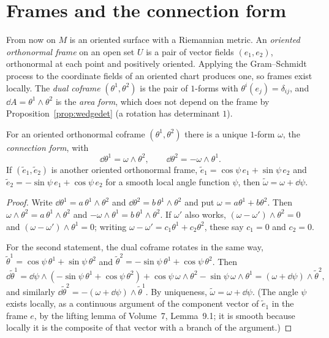 \section{Frames and the connection form}

From now on $M$ is an oriented surface with a Riemannian metric. An \emph{oriented orthonormal frame} on an open set $U$ is a pair of vector fields $(e_1,e_2)$,
orthonormal at each point and positively oriented. Applying the Gram--Schmidt process to the coordinate fields of an oriented chart produces one, so frames
exist locally. The \emph{dual coframe} $(\theta^1,\theta^2)$ is the pair of $1$-forms with $\theta^i(e_j)=\delta_{ij}$, and $\dd A=\theta^1\wedge\theta^2$ is the \emph{area form},
which does not depend on the frame by Proposition~\ref{prop:wedgedet} (a rotation has determinant $1$).

\begin{proposition}\label{prop:structure}
For an oriented orthonormal coframe $(\theta^1,\theta^2)$ there is a unique $1$-form $\omega$, the \emph{connection form}, with
\[
\dd\theta^1=\omega\wedge\theta^2,\qquad\dd\theta^2=-\omega\wedge\theta^1.
\]
If $(\tilde e_1,\tilde e_2)$ is another oriented orthonormal frame, $\tilde e_1=\cos\psi\,e_1+\sin\psi\,e_2$ and $\tilde e_2=-\sin\psi\,e_1+\cos\psi\,e_2$ for a smooth local angle
function $\psi$, then $\tilde\omega=\omega+\dd\psi$.
\end{proposition}
\begin{proof}
Write $\dd\theta^1=a\,\theta^1\wedge\theta^2$ and $\dd\theta^2=b\,\theta^1\wedge\theta^2$ and put $\omega=a\theta^1+b\theta^2$. Then $\omega\wedge\theta^2=a\,\theta^1\wedge\theta^2$ and $-\omega\wedge\theta^1=b\,\theta^1\wedge\theta^2$.
If $\omega'$ also works, $(\omega-\omega')\wedge\theta^2=0$ and $(\omega-\omega')\wedge\theta^1=0$; writing $\omega-\omega'=c_1\theta^1+c_2\theta^2$, these say $c_1=0$ and $c_2=0$.

For the second statement, the dual coframe rotates in the same way, $\tilde\theta^1=\cos\psi\,\theta^1+\sin\psi\,\theta^2$ and $\tilde\theta^2=-\sin\psi\,\theta^1+\cos\psi\,\theta^2$. Then
\[
\dd\tilde\theta^1=\dd\psi\wedge(-\sin\psi\,\theta^1+\cos\psi\,\theta^2)+\cos\psi\,\omega\wedge\theta^2-\sin\psi\,\omega\wedge\theta^1=(\omega+\dd\psi)\wedge\tilde\theta^2,
\]
and similarly $\dd\tilde\theta^2=-(\omega+\dd\psi)\wedge\tilde\theta^1$. By uniqueness, $\tilde\omega=\omega+\dd\psi$. (The angle $\psi$ exists locally, as a continuous argument of the
component vector of $\tilde e_1$ in the frame $e$, by the lifting lemma of Volume~7, Lemma~9.1; it is smooth because locally it is the composite of that vector with a
branch of the argument.)
\end{proof}

